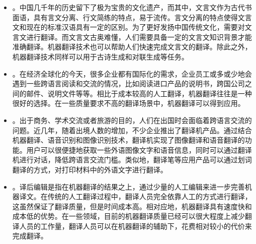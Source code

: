 \begin{itemize}
\item {\small{}}。中国几千年的历史留下了极为宝贵的文化遗产，而其中，文言文作为古代书面语，具有言文分离、行文简练的特点，易于流传。言文分离的特点使得文言文和现在的标准汉语具有一定的区别。为了更好发扬中国传统文化，需要对文言文进行翻译。而文言文古奥难懂，人们需要具备一定的文言文知识背景才能准确翻译。机器翻译技术也可以帮助人们快速完成文言文的翻译。除此之外，机器翻译技术同样可以用于古诗生成和对联生成等任务。

\item {\small{}}。在经济全球化的今天，很多企业都有国际化的需求，企业员工或多或少地会遇到一些跨语言阅读和交流的情况，比如阅读进口产品的说明书，跨国公司之间的邮件、说明文件等等。相比于成本较高的人工翻译，机器翻译往往是一种很好的选择。在一些质量要求不高的翻译场景中，机器翻译可以得到应用。

\item {\small{}}。出于商务、学术交流或者旅游的目的，人们在出国时会面临着跨语言交流的问题。近几年，随着出境人数的增加，不少企业推出了翻译机产品。通过结合机器翻译、语音识别和图像识别技术，翻译机实现了图像翻译和语音翻译的功能。用户可以很便捷地获取一些外语图像文字和语音信息，同时可以通过翻译机进行对话，降低跨语言交流门槛。类似地，翻译笔等应用产品可以通过划词翻译的方式，对打印材料中的外语文字进行翻译。

\item {\small{}}。译后编辑是指在机器翻译的结果之上，通过少量的人工编辑来进一步完善机器译文。在传统的人工翻译过程中，翻译人员完全依靠人工的方式进行翻译，这虽然保证了翻译质量，但是时间成本高。相对应地，机器翻译具有速度快和成本低的优势。在一些领域，目前的机器翻译质量已经可以很大程度上减少翻译人员的工作量，翻译人员可以在机器翻译的辅助下，花费相对较小的代价来完成翻译。

\end{itemize}


